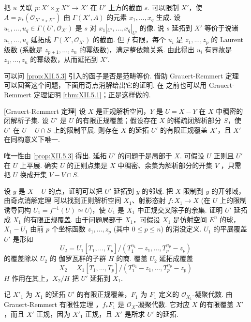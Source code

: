 把 $u$ 关联 $p \colon X' \times_X X'' \to X'$ 在 $U'$ 上方的截面 $s$. 可以限制 $X'$，使 $A = p_*(\mathcal{O}_{X' \times_X X''})$ 由 $\Gamma(X', A)$ 的元素 $x_1, \ldots, x_q$ 生成. 设 $u_1, \ldots, u_q \in \Gamma(U', \mathcal{O}_{X'})$ 是 $s$ 对 $x_1|_{U'}, \ldots, x_q|_{U'}$ 的像. 说 $s$ 延拓到 $X'$ 等价于说诸 $u_1, \ldots, u_q$ 延拓成 $\Gamma(X', \mathcal{O}_{X'})$ 的截面. 但 $f$ 有限，每个 $u_i$ 是 $z_1, \ldots, z_p$ 的 Laurent 级数 (系数是 $z_{p+1}, \ldots, z_n$ 的幂级数)，满足整依赖关系. 由此得出 $u_i$ 有界故是 $z_1, \ldots, z_n$ 的幂级数，从而延拓到 $X'$.

可以问 \ref{prop:XII.5.3} 引入的函子是否是范畴等价. 借助 Grauert-Remmert 定理 \cite{exp12-6} 可以回答这个问题，下面用奇点消解给出它的证明. 在 \cite{exp12-8} 之前也可以用 Grauert-Remmert 定理证明 \ref{thm:XII.5.1}；正是这样做的.

\begin{theorem}\label{thm:XII.5.4}
[Grauert-Remmert 定理] 设 $X$ 是正规解析空间，$Y$ 是 $U = X - Y$ 在 $X$ 中稠密的闭解析子集. 设 $U'$ 是 $U$ 的有限正规覆盖；假设存在 $X$ 的稀疏闭解析部分 $S$，使 $U'$ 在 $U - U \cap S$ 上的限制平展. 则存在 $X$ 的延拓 $U'$ 的有限正规覆盖 $X'$，且 $X'$ 在同构意义下唯一.
\end{theorem}

唯一性由 \ref{prop:XII.5.3} 得出. 延拓 $U'$ 的问题于是局部于 $X$. 可假设 $U$ 正则且 $U'$ 在 $U$ 上平展. 确实 $U$ 的正则点集是 $X$ 中稠密、余集为解析部分的开集 $V$ \cite[第 20 号 D 定理 2]{exp12-4}，只需把 $U$ 换成开集 $V - V \cap S$.

设 $y$ 是 $X - U$ 的点，证明可以把 $U'$ 延拓到 $y$ 的邻域. 把 $X$ 限制到 $y$ 的开邻域，由奇点消解定理 \cite{exp12-8} 可以找到正则解析空间 $X_1$、射影态射 $f \colon X_1 \to X$ (在 $U$ 上的限制诱导同构 $U_1 = f^{-1}(U) \simeq U$)，使 $U_1$ 是 $X_1$ 中正规交叉除子的余集. 证明 $U'$ 延拓成 $X_1$ 的有限正规覆盖. 由于问题局部于 $X_1$，可假设 $X_1$ 是仿射空间 $E^n$ 的球，$X_1 - U_1$ 由前 $p$ 个坐标函数 $z_1, \ldots, z_p$ (其中 $0 \leqslant p \leqslant n$) 的消没定义. $U_1$ 的平展覆盖 $U'$ 是形如
\[
U_2 = U_1[T_1, \ldots, T_p]/(T_1^{n_1} - z_1, \ldots, T_p^{n_p} - z_p)
\]
的覆盖除以 $U_2$ 的 伽罗瓦群的子群 $H$ 的商. 覆盖 $U_2$ 延拓成覆盖
\[
X_2 = X_1[T_1, \ldots, T_p]/(T_1^{n_1} - z_1, \ldots, T_p^{n_p} - z_p)
\]
$H$ 作用在其上，$X_2/H$ 把 $U'$ 延拓到 $X_1$.

记 $X'_1$ 为 $X_1$ 的延拓 $U'$ 的有限正规覆盖，$F_1$ 为 $F_1$ 定义的 $\mathcal{O}_{X_1}$-凝聚代数. 由 Grauert-Remmert 有限性定理 \cite[第 15 号 \cref{thm:XII.1.1}]{exp12-4}，$f_* F_1$ 是 $\mathcal{O}_X$-凝聚代数. 它对应 $X$ 的有限覆盖 $X'$，而且 $X'$ 正规，因为 $X'_1$ 正规，且 $X'$ 是所求 $U'$ 的延拓.

